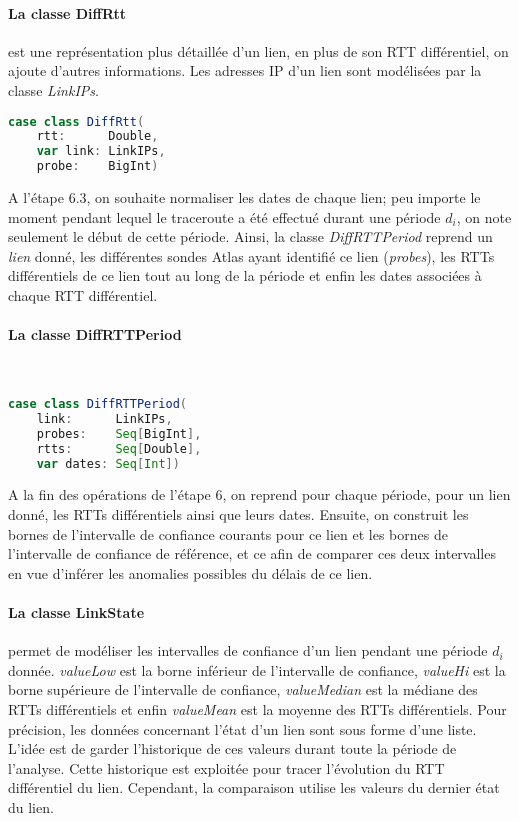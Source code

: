 \paragraph{La classe DiffRtt} est une représentation plus détaillée d'un lien, en plus de son RTT différentiel, on ajoute d'autres informations.  Les adresses IP d'un lien sont modélisées par la classe \textit{LinkIPs}.

\begin{lstlisting}[language=scala, caption={La classe DiffRtt en Scala }]
case class DiffRtt(
	rtt:      Double,
	var link: LinkIPs,
	probe:    BigInt)
\end{lstlisting}

A l'étape 6.3, on souhaite normaliser les dates de chaque lien; peu importe le moment pendant lequel le traceroute a été effectué durant une période $d_i$, on note seulement le début de cette période. Ainsi,  la classe  \textit{DiffRTTPeriod}  reprend un \textit{lien} donné, les différentes sondes Atlas ayant identifié ce lien (\textit{probes}), les RTTs différentiels de ce lien tout au long de la période et enfin les dates associées à chaque RTT différentiel.
\paragraph{La classe DiffRTTPeriod } ~
\begin{lstlisting}[language=scala, caption={La classe DiffRTTPeriod en Scala }]
case class DiffRTTPeriod(
	link:      LinkIPs,
	probes:    Seq[BigInt],
	rtts:      Seq[Double],
	var dates: Seq[Int])
\end{lstlisting}

A la fin des opérations de l'étape 6, on reprend pour chaque période, pour un lien donné, les RTTs différentiels ainsi que leurs dates. Ensuite, on construit les bornes de l'intervalle de confiance courants pour ce lien et les bornes de l'intervalle de confiance de référence, et ce afin de comparer ces deux intervalles en vue d'inférer les anomalies possibles du délais de ce lien.


\paragraph{La classe LinkState } permet de modéliser les intervalles de confiance d'un lien pendant une période $d_i$ donnée. \textit{valueLow} est la borne inférieur de l'intervalle de confiance, \textit{valueHi} est la borne supérieure de l'intervalle de confiance, \textit{valueMedian} est la médiane des RTTs différentiels et enfin \textit{valueMean} est la moyenne des RTTs différentiels. Pour précision, les données concernant l'état d'un lien sont sous forme d'une liste. L'idée est de garder l'historique de ces valeurs durant toute la période de l'analyse. Cette historique est exploitée pour tracer l'évolution du RTT différentiel du lien. Cependant, la comparaison utilise les valeurs du dernier état du lien.

